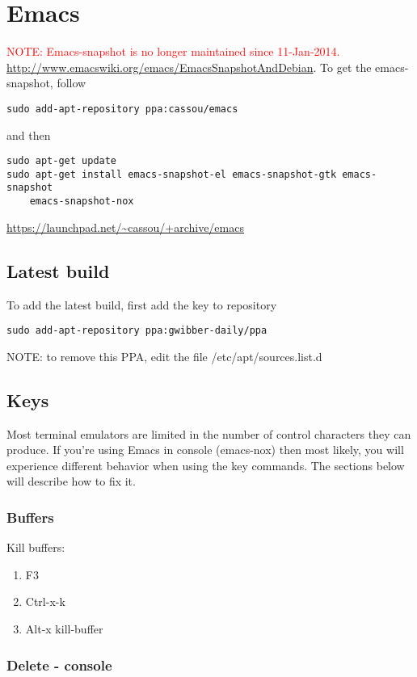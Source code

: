 \chapter{Emacs}

\textcolor{red}{NOTE: Emacs-snapshot is no longer maintained since 11-Jan-2014.} 
\url{http://www.emacswiki.org/emacs/EmacsSnapshotAndDebian}. To get the
emacs-snapshot, follow
\begin{verbatim}
sudo add-apt-repository ppa:cassou/emacs
\end{verbatim}
and then
\begin{verbatim}
sudo apt-get update
sudo apt-get install emacs-snapshot-el emacs-snapshot-gtk emacs-snapshot
    emacs-snapshot-nox
\end{verbatim}
\url{https://launchpad.net/~cassou/+archive/emacs}

\section{Latest build}

To add the latest build, first add the key to repository
\begin{verbatim}
sudo add-apt-repository ppa:gwibber-daily/ppa
\end{verbatim}
NOTE: to remove this PPA, edit the file /etc/apt/sources.list.d

\section{Keys}

Most terminal emulators are limited in the number of control characters they can
produce. If you're using Emacs in console (emacs-nox) then most likely, you will
experience different behavior when using the key commands. The sections below
will describe how to fix it.

\subsection{Buffers}

Kill buffers: 
\begin{enumerate}
  \item F3
  \item Ctrl-x-k
  \item Alt-x kill-buffer
\end{enumerate}

\subsection{Delete - console} 

